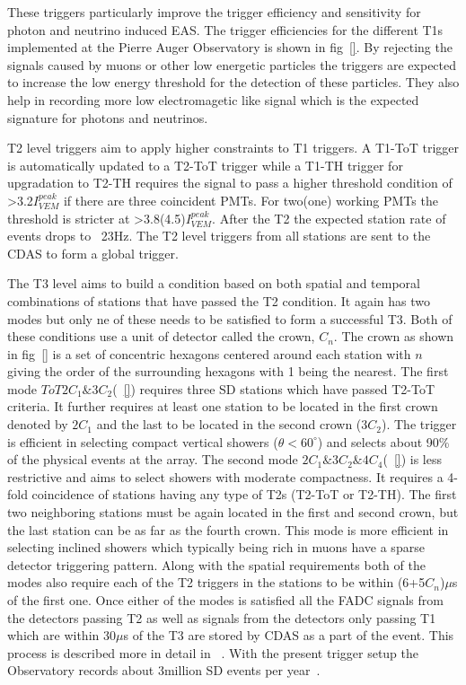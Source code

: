 These triggers particularly improve the trigger efficiency and sensitivity for photon and neutrino induced EAS. The trigger efficiencies for the different T1s implemented at the Pierre Auger Observatory is shown in fig~\ref{}. By rejecting the signals caused by muons or other low energetic particles the triggers are expected to increase the low energy threshold for the detection of these particles. They also help in recording more low electromagetic like signal which is the expected signature for photons and neutrinos. 

T2 level triggers aim to apply higher constraints to T1 triggers. A T1-ToT trigger is automatically updated to a T2-ToT trigger while a T1-TH trigger for upgradation to T2-TH requires the signal to pass a higher threshold condition of >3.2$I_{VEM}^{peak}$ if there are three coincident PMTs. For two(one) working PMTs the threshold is stricter at >3.8(4.5)$I_{VEM}^{peak}$. After the T2 the expected station rate of events drops to ~23Hz. The T2 level triggers from all stations are sent to the CDAS to form a global trigger.

The T3 level aims to build a condition based on both spatial and temporal combinations of stations that have passed the T2 condition. It again has two modes but only ne of these needs to be satisfied to form a successful T3. Both of these conditions use a unit of detector called the crown, $C_n$. The crown as shown in fig~\ref{} is a set of concentric hexagons centered around each station with $n$ giving the order of the surrounding hexagons with 1 being the nearest. The first mode $ToT2C_1\&3C_2$(~\ref{}) requires three SD stations which have passed T2-ToT criteria. It further requires at least one station to be located in the first crown denoted by $2C_1$ and the last to be located in the second crown ($3C_2$). The trigger is efficient in selecting compact vertical showers ($\theta < 60^{\circ}$) and selects about 90\% of the physical events at the array. The second mode $2C_1\&3C_2\&4C_4$(~\ref{}) is less restrictive and aims to select showers with moderate compactness. It requires a 4-fold coincidence of stations having any type of T2s (T2-ToT or T2-TH). The first two neighboring stations must be again located in the first and second crown, but the last station can be as far as the fourth crown. This mode is more efficient in selecting inclined showers which typically being rich in muons have a sparse detector triggering pattern. Along with the spatial requirements both of the modes also require each of the T2 triggers in the stations to be within (6+5$C_n$)$\mu$s of the first one. Once either of the modes is satisfied all the FADC signals from the detectors passing T2 as well as signals from the detectors only passing T1 which are within 30$\mu$s of the T3 are stored by CDAS as a part of the event. This process is described more in detail in ~\cite{}. With the present trigger setup the Observatory records about 3million SD events per year~\cite{}. 




